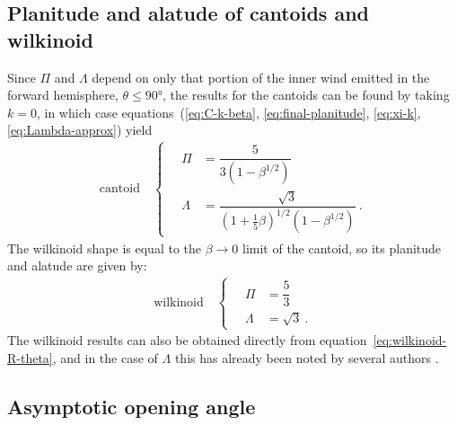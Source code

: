 \subsection{Planitude and alatude of cantoids and wilkinoid}
\label{sec:cantoid-wilkinoid-shapes}

Since \(\Pi\) and \(\Lambda\) depend on only that portion of the inner wind
emitted in the forward hemisphere, \(\theta \le \ang{90}\), the results for the
cantoids can be found by taking \(k = 0\), in which case
equations~(\ref{eq:C-k-beta}, \ref{eq:final-planitude}, \ref{eq:xi-k},
\ref{eq:Lambda-approx}) yield
\begin{gather}
  \label{eq:cantoid-Pi-Lambda}
  \text{cantoid} \quad
  \begin{cases}
    \quad \Pi &= \dfrac {5} {3 \left( 1 - \beta^{1/2} \right)}\\[12pt]
    \quad \Lambda &= \dfrac { \sqrt 3} {\left( 1 + \tfrac15 \beta \right)^{1/2} \left( 1 - \beta^{1/2} \right)} \ .
  \end{cases}
\end{gather}
The wilkinoid shape is equal to the \(\beta \to 0\) limit of the cantoid, so
its planitude and alatude are given by:
\begin{gather}
  \label{eq:wilkinoid-Pi-Lambda}
  \text{wilkinoid} \quad
  \begin{cases}
    \quad \Pi &= \dfrac {5} {3}\\[10pt]
    \quad \Lambda &= \sqrt 3 \ .
  \end{cases}
\end{gather}
The wilkinoid results can also be obtained directly from
equation~\eqref{eq:wilkinoid-R-theta}, and in the case of \(\Lambda\) this
has already been noted by several authors \citep{Cox:2012a,
  Meyer:2016a}.

\subsection{Asymptotic opening angle}
\label{sec:asympt-open-angle}

